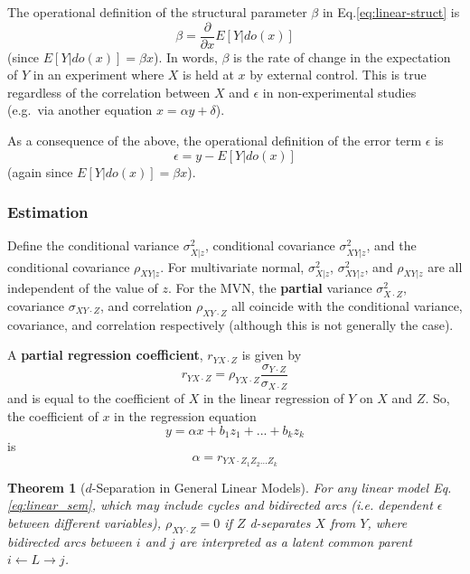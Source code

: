 \documentclass[11pt]{article}
\numberwithin{equation}{section}
\newtheorem{thm}{Theorem}[section]
\begin{document}
The operational definition of the structural parameter $\beta$ in Eq.\eqref{eq:linear-struct} is
\begin{equation}
\beta = \frac{\partial}{\partial x}E[Y|do(x)]
\end{equation}
(since $E[Y|do(x)]=\beta x$). In words, $\beta$ is the rate of change in the expectation of $Y$ in an experiment where $X$ is held at $x$ by external control. This is true regardless of the correlation between $X$ and $\epsilon$ in non-experimental studies (e.g.\ via another equation $x=\alpha y + \delta$).

As a consequence of the above, the operational definition of the error term $\epsilon$ is
\begin{equation}
\epsilon = y - E[Y|do(x)]
\end{equation}
(again since $E[Y|do(x)]=\beta x$). 

\subsubsection{Estimation}

Define the conditional variance $\sigma^2_{X|z}$, conditional covariance $\sigma^2_{XY|z}$, and the conditional covariance $\rho_{XY|z}$. For multivariate normal, $\sigma^2_{X|z}$, $\sigma^2_{XY|z}$, and $\rho_{XY|z}$ are all independent of the value of $z$. For the MVN, the \textbf{partial} variance $\sigma^2_{X\cdot Z}$, covariance $\sigma_{XY\cdot Z}$, and correlation $\rho_{XY\cdot Z}$ all coincide with the conditional variance, covariance, and correlation respectively (although this is not generally the case). 

A \textbf{partial regression coefficient}, $r_{YX\cdot Z}$ is given by
\begin{equation}
r_{YX\cdot Z} = \rho_{YX\cdot Z} \frac{\sigma_{Y\cdot Z}}{\sigma_{X\cdot Z}}
\end{equation}
and is equal to the coefficient of $X$ in the linear regression of $Y$ on $X$ and $Z$. So, the coefficient of $x$ in the regression equation
\begin{equation}
y = \alpha x + b_1 z_1 +...+ b_k z_k
\end{equation}
is
\begin{equation}
\alpha=r_{YX\cdot Z_1Z_2...Z_k}
\end{equation}

\begin{thm}[$d$-Separation in General Linear Models]
For any linear model Eq.\eqref{eq:linear_sem}, which may include cycles and bidirected arcs (i.e. dependent $\epsilon$ between different variables), $\rho_{XY\cdot Z}=0$ if $Z$ d-separates $X$ from $Y$, where bidirected arcs between $i$ and $j$ are interpreted as a latent common parent $i \leftarrow L \rightarrow j$. \label{thm:d-sep-lin-model}
\end{thm}
\end{document}
